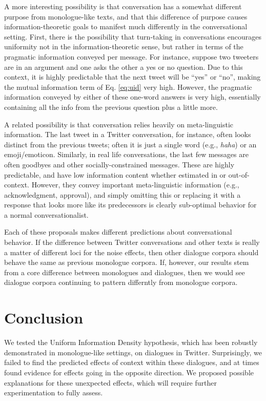 \documentclass[11pt,letterpaper]{article}
\begin{document}
A more interesting possibility is that conversation has a somewhat different purpose from monologue-like texts, and that this difference of purpose causes information-theoretic goals to manifest much differently in the conversational setting. First, there is the possibility that turn-taking in conversations encourages uniformity not in the information-theoretic sense, but rather in terms of the pragmatic information conveyed per message.  For instance, suppose two tweeters are in an argument and one asks the other a yes or no question.  Due to this context, it is highly predictable that the next tweet will be ``yes'' or ``no'', making the mutual information term of Eq. \ref{eq:uid} very high.  However, the pragmatic information conveyed by either of these one-word answers is very high, essentially containing all the info from the previous question plus a little more.

A related possibility is that conversation relies heavily on meta-linguistic information.  The last tweet in a Twitter conversation, for instance, often looks distinct from the previous tweets; often it is just a single word (e.g., {\it haha}) or an emoji/emoticon.  Similarly, in real life conversations, the last few messages are often goodbyes and other socially-constrained messages.  These are highly predictable, and have low information content whether estimated in or out-of-context.  However, they convey important meta-linguistic information (e.g., acknowledgment, approval), and simply omitting this or replacing it with a response that looks more like its predecessors is clearly sub-optimal behavior for a normal conversationalist.

Each of these proposals makes different predictions about conversational behavior.  If the difference between Twitter conversations and other texts is really a matter of different loci for the noise effects, then other dialogue corpora should behave the same as previous monologue corpora.  If, however, our results stem from a core difference between monologues and dialogues, then we would see dialogue corpora continuing to pattern differntly from monologue corpora.


\section{Conclusion}

We tested the Uniform Information Density hypothesis, which has been robustly demonstrated in monologue-like settings, on dialogues in Twitter. Surprisingly, we failed to find the predicted effects of context within these dialogues, and at times found evidence for effects going in the opposite direction.  We proposed possible explanations for these unexpected effects, which will require further experimentation to fully assess.

%

\newpage
~
\newpage


\end{document}
